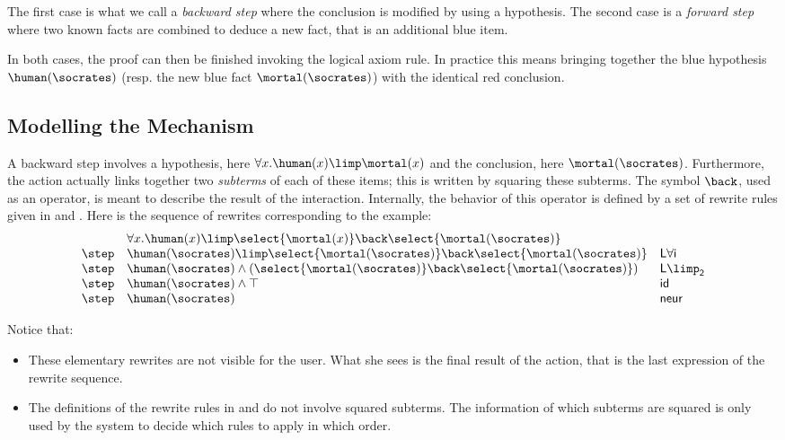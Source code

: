 The first case is what we call a {\em backward step} where the conclusion is
modified by using a hypothesis. The second case is a {\em forward step} where
two known facts are combined to deduce a new fact, that is an additional blue
item.

In both cases, the proof can then be finished invoking the logical
axiom rule. In practice this means bringing together the blue
hypothesis $\human(\socrates)$ (resp. the new blue fact
$\mortal(\socrates)$) with the identical red conclusion.


\subsection{Modelling the Mechanism}

A backward step involves a hypothesis, here $\forall x.\-\human(x)
\allowbreak\limp \mortal(x)$ and the conclusion, here $\mortal(\socrates)$.
Furthermore, the action actually links together two {\em subterms} of each of
these items; this is written by squaring these subterms. The symbol ${\back}$,
used as an operator, is meant to describe the result of the interaction.
Internally, the behavior of this operator is defined by a set of rewrite rules
given in  and . Here is the sequence of
rewrites corresponding to the example: \renewcommand{\arraystretch}{1.1}
$$\begin{array}{lll}
    &  \forall x.\human(x)\limp \select{\mortal(x)} \back \select{\mortal(\socrates)}&\\
    \step &
           \human(\socrates)\limp \select{\mortal(\socrates)}
           \back \select{\mortal(\socrates)}&
                                               \mathsf{L\forall i}\\
    \step &
           \human(\socrates)\land(\select{\mortal(\socrates)}
           \back \select{\mortal(\socrates)}) &
                                                 \mathsf{L{\limp}_2}\\
    \step &  \human(\socrates)\land \top &
                                           \mathsf{id}\\
    \step & \human(\socrates)&\mathsf{neur}\\
  \end{array}$$

Notice that:
\begin{itemize}
\item   These elementary rewrites are not visible for the user. What she sees is
  the final result of the action, that is the last expression of the rewrite
  sequence.
\item The definitions of the rewrite rules in  and
   do not involve squared subterms. The information of which
  subterms are squared is only used by the system to decide which rules to
  apply in which order.
\end{itemize}

